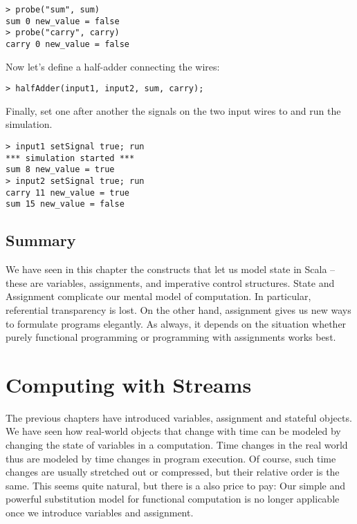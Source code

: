 {\begin{lstlisting}
> probe("sum", sum)
sum 0 new_value = false
> probe("carry", carry)
carry 0 new_value = false
\end{lstlisting}
Now let's define a half-adder connecting the wires:
\begin{lstlisting}
> halfAdder(input1, input2, sum, carry);
\end{lstlisting}
Finally, set one after another the signals on the two input wires to
 and run the simulation.
\begin{lstlisting}
> input1 setSignal true; run
*** simulation started ***
sum 8 new_value = true
> input2 setSignal true; run
carry 11 new_value = true
sum 15 new_value = false
\end{lstlisting}

\section{Summary}

We have seen in this chapter the constructs that let us model state in
Scala -- these are variables, assignments, and imperative control
structures.  State and Assignment complicate our mental model of
computation.  In particular, referential transparency is lost.  On the
other hand, assignment gives us new ways to formulate programs
elegantly. As always, it depends on the situation whether purely
functional programming or programming with assignments works best.

\chapter{Computing with Streams}

The previous chapters have introduced variables, assignment and
stateful objects.  We have seen how real-world objects that change
with time can be modeled by changing the state of variables in a
computation.  Time changes in the real world thus are modeled by time
changes in program execution. Of course, such time changes are usually
stretched out or compressed, but their relative order is the same.
This seems quite natural, but there is a also price to pay: Our simple
and powerful substitution model for functional computation is no
longer applicable once we introduce variables and assignment.

}
